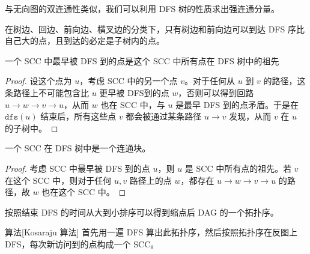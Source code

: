 与无向图的双连通性类似，我们可以利用 DFS 树的性质求出强连通分量。
\begin{property}
    在树边、回边、前向边、横叉边的分类下，只有树边和前向边可以到达 DFS 序比自己大的点，且到达的必定是子树内的点。
\end{property}
\begin{lemma}
    一个 SCC 中最早被 DFS 到的点是这个 SCC 中所有点在 DFS 树中的祖先
\end{lemma}
\begin{proof}
    设这个点为 $u$，考虑 SCC 中的另一个点 $v$。对于任何从 $u$ 到 $v$ 的路径，这条路径上不可能包含比 $u$ 更早被 DFS到的点 $w$，否则可以得到回路 $u\to w\to v\to u$，从而 $w$ 也在 SCC 中，与 $u$ 是最早 DFS 到的点矛盾。于是在 $\mathtt{dfs}(u)$ 结束后，所有这些点 $v$ 都会被通过某条路径 $u\to v$ 发现，从而 $v$ 在 $u$ 的子树中。

\end{proof}
\begin{corollary}
    一个 SCC 在 DFS 树中是一个连通块。
\end{corollary}
\begin{proof}
    考虑 SCC 中最早被 DFS 到的点 $u$，则 $u$ 是 SCC 中所有点的祖先。若 $v$ 在这个 SCC 中，则对于任何 $u,v$ 路径上的点 $w$，都存在 $u\to w\to v\to u$ 的路径，故 $w$ 也在这个 SCC 中。
\end{proof}

\begin{lemma}
    按照结束 DFS 的时间从大到小排序可以得到缩点后 DAG 的一个拓扑序。
\end{lemma}

\begin{descbox}{算法}[Kosaraju 算法]
    首先用一遍 DFS 算出此拓扑序，然后按照拓扑序在反图上 DFS，每次新访问到的点构成一个 SCC。
\end{descbox}

